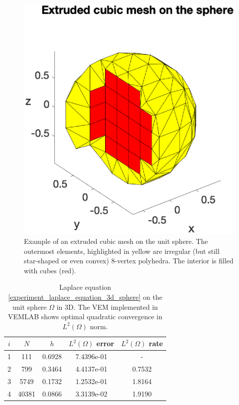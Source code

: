\documentclass[a4paper]{article}
\begin{document}
\begin{figure}[H]
\begin{center}
\includegraphics[scale=0.5]{extruded_mesh_sphere.eps}
\end{center}
\caption{Example of an extruded cubic mesh on the unit sphere.  The outermost elements, highlighted in yellow are irregular (but still star-shaped or even convex) $8$-vertex polyhedra.  The interior is filled with cubes (red).}
\label{fig:extruded_mesh_sphere}
\end{figure} 

\begin{table}[H]
\caption{Laplace equation \eqref{experiment_laplace_equation_3d_sphere} on the unit sphere $\Omega$ in 3D. The VEM implemented in VEMLAB shows optimal quadratic convergence in $L^2(\Omega)$ norm.}
\begin{center}
\begin{tabular}{c | c | c | c | c}
$i$ & $N$ & $h$ & $L^2(\Omega)$ error & $L^2(\Omega)$ rate\\
\hline
1 & 111 & 0.6928 &   7.4396e-01 &     -\\
2 & 799 & 0.3464 & 4.4137e-01 & 0.7532    \\
3 & 5749 & 0.1732 & 1.2532e-01 & 1.8164    \\
4 & 40381 & 0.0866 &  3.3139e-02 & 1.9190
\end{tabular}
\end{center}
\label{tab:laplace_3d_convergence_sphere}
\end{table}
\end{document}
